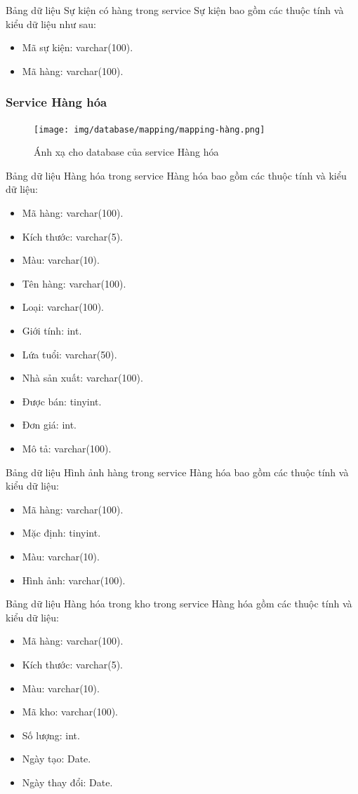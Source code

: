 Bảng dữ liệu Sự kiện có hàng trong service Sự kiện bao gồm các thuộc tính và kiểu dữ liệu như sau:
\begin{itemize}
	\item Mã sự kiện: varchar(100).
	\item Mã hàng: varchar(100).
\end{itemize}

\subsubsection{Service Hàng hóa}
\begin{figure}[!htp]
	\begin{center}
		\texttt{[image: img/database/mapping/mapping-hàng.png]}
		\newline
		\caption{Ánh xạ cho database của service Hàng hóa}
	\end{center}
\end{figure}

Bảng dữ liệu Hàng hóa trong service Hàng hóa bao gồm các thuộc tính và kiểu dữ liệu:
\begin{itemize}
	\item Mã hàng: varchar(100).
	\item Kích thước: varchar(5).
	\item Màu: varchar(10).
	\item Tên hàng: varchar(100).
	\item Loại: varchar(100).
	\item Giới tính: int.
	\item Lứa tuổi: varchar(50).
	\item Nhà sản xuất: varchar(100).
	\item Được bán: tinyint.
	\item Đơn giá: int.
	\item Mô tả: varchar(100).
\end{itemize}

Bảng dữ liệu Hình ảnh hàng trong service Hàng hóa bao gồm các thuộc tính và kiểu dữ liệu:
\begin{itemize}
	\item Mã hàng: varchar(100).
	\item Mặc định: tinyint.
	\item Màu: varchar(10).
	\item Hình ảnh: varchar(100).
\end{itemize}

Bảng dữ liệu Hàng hóa trong kho trong service Hàng hóa gồm các thuộc tính và kiểu dữ liệu:
\begin{itemize}
	\item Mã hàng: varchar(100).
	\item Kích thước: varchar(5).
	\item Màu: varchar(10).
	\item Mã kho: varchar(100).
	\item Số lượng: int.
	\item Ngày tạo: Date.
	\item Ngày thay đổi: Date.
\end{itemize}

